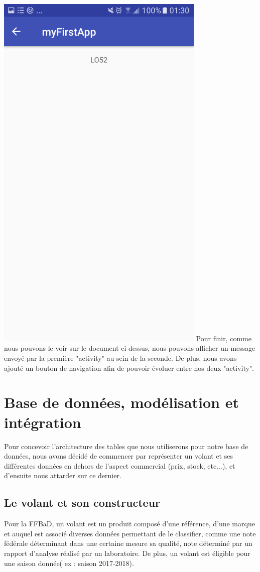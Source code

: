 \documentclass[french,a4paper,12pt]{report}
\begin{document}
 \includegraphics[width=10cm]{22.png}
\bigbreak
Pour finir, comme nous pouvons le voir sur le document ci-dessus, nous pouvons
afficher un message envoyé par la première "activity" au sein de la seconde.
De plus, nous avons ajouté un bouton de navigation afin de pouvoir évoluer
entre nos deux "activity".






\chapter{Base de données, modélisation et intégration}
Pour concevoir l'architecture des tables que nous utiliserons pour notre base
de données, nous avons décidé de commencer par représenter un volant et ses
différentes données en dehors de l'aspect commercial (prix, stock, etc...),
et d'ensuite nous attarder sur ce dernier.

\section{Le volant et son constructeur}
Pour la FFBaD, un volant est un produit composé d'une référence, d'une marque
et auquel est associé diverses données permettant de le classifier, comme une
note fédérale déterminant dans une certaine mesure sa qualité, note déterminé
par un rapport d'analyse réalisé par un laboratoire. De plus, un volant est
éligible pour une saison donnée( ex : saison 2017-2018).
\end{document}
